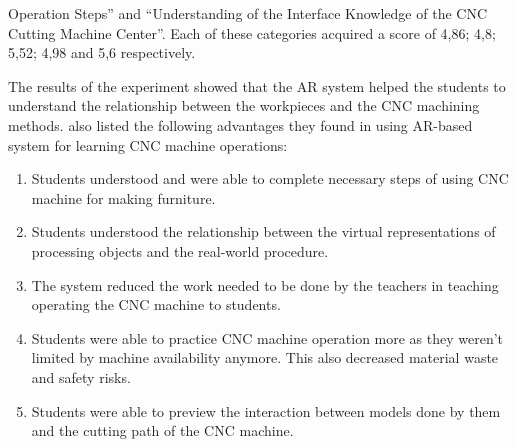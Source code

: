 Operation Steps” and “Understanding of the Interface Knowledge of the CNC 
Cutting Machine Center”.\cite{LinAndLee2020} Each of these categories acquired 
a score of 4,86; 4,8; 5,52; 4,98 and 5,6 respectively.\cite{LinAndLee2020}\par
	The results of the experiment showed that the AR system helped the 
students to understand the relationship between the workpieces and the CNC 
machining methods.\cite{LinAndLee2020} \textcite{LinAndLee2020} also listed 
the following advantages they found in using AR-based system for learning CNC 
machine operations:
\begin{enumerate}
	\item Students understood and were able to complete necessary steps of using CNC machine for making furniture.
	\item Students understood the relationship between the virtual representations of processing objects and the real-world procedure.
	\item The system reduced the work needed to be done by the teachers in teaching operating the CNC machine to students.
	\item Students were able to practice CNC machine operation more as they weren't limited by machine availability anymore. This also decreased material waste and safety risks.
	\item Students were able to preview the interaction between models done by them and the cutting path of the CNC machine.
\end{enumerate}
